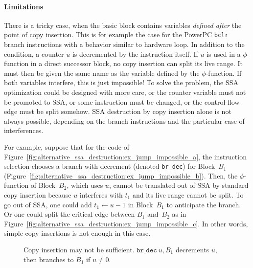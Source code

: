 \paragraph{Limitations}
There is a  tricky case, when the basic block contains variables
\emph{defined after} the point of copy insertion. This is for example the case for the PowerPC
\texttt{bclr} branch instructions with a behavior similar to hardware loop. In
addition to the condition, a counter $u$ is decremented by the instruction
itself. If $u$ is used in a $\phi$-function in a direct successor block, no
copy insertion can split its live range. It must then be given the same name as
the variable defined by the $\phi$-function. If both variables interfere, this
is just impossible! To solve the problem, the SSA optimization could be
designed with more care, or the counter variable must not be promoted to SSA,
or some instruction must be changed, or the control-flow edge must be split
somehow.  SSA destruction by
copy insertion alone is not always possible, depending on the branch
instructions and the particular case of interferences.

For example, suppose that for the code of
Figure~\ref{fig:alternative_ssa_destruction:ex_jump_impossible_a}, the instruction selection chooses a branch
with decrement (denoted \texttt{br\_dec}) for Block~$B_1$
(Figure~\ref{fig:alternative_ssa_destruction:ex_jump_impossible_b}).  Then, the $\phi$-function of
Block~$B_2$, which uses $u$, cannot be translated out of SSA by standard copy
insertion because $u$ interferes with $t_1$ and its live range cannot be split.
To go out of SSA, one could add $t_1\gets u-1$ in Block~$B_1$ to anticipate the
branch. Or one could split the critical edge between $B_1$ and~$B_2$ as in
Figure~\ref{fig:alternative_ssa_destruction:ex_jump_impossible_c}. In other words, simple copy insertions is not enough in this case.

\begin{figure}[h]
\hfill
{}
\hfill
{}
\caption{Copy insertion may not be sufficient. $\texttt{br\_dec}\ u,B_1$ decrements $u$, then branches to $B_1$ if $u\neq 0$.\label{fig:alternative_ssa_destruction:ex_jump_impossible}}
\end{figure}

